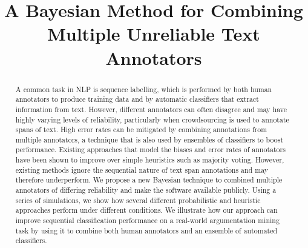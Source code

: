 \documentclass[conference]{IEEEtran}
\title{ 
A Bayesian Method for Combining Multiple Unreliable Text Annotators
}
\author{\IEEEauthorblockN{Anonymous}
\IEEEauthorblockA{Anonymous, \\
Anonymous \\
Email: anonymous}
\and
\IEEEauthorblockN{Anonymous}
\IEEEauthorblockA{Anonymous, \\
Anonymous \\
Email: anonymous}
\and
\IEEEauthorblockN{Anonymous}
\IEEEauthorblockA{Anonymous, \\
Anonymous \\
Email: anonymous}
}
\begin{document}
\maketitle

\begin{abstract}
A common task in NLP is sequence labelling, which is performed by both human annotators to 
produce training data and by automatic classifiers that extract information from text.
However, different annotators can often disagree and may have highly varying levels of reliability,
particularly when crowdsourcing is used to annotate spans of text. 
High error rates can be mitigated by combining annotations from multiple annotators,
a technique that is also used by ensembles of classifiers to boost performance.
Existing approaches that model the biases and error rates of annotators have been shown to 
improve over simple heuristics such as majority voting. However, existing methods
ignore the sequential nature of text span annotations and may therefore underperform.
We propose a new Bayesian technique to combined multiple annotators of differing reliability 
and make the software available publicly. 
Using a series of simulations, we show how several different probabilistic
and heuristic approaches perform under different conditions. 
We illustrate how our approach can improve sequential classification performance on a 
real-world argumentation mining task by using it to combine both human annotators and 
an ensemble of automated classifiers.
\end{abstract}

%
\IEEEpeerreviewmaketitle









%


\end{document}
